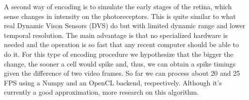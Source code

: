 A second way of encoding is to simulate the early stages of the retina, which
sense changes in intensity on the photoreceptors. This is quite similar to what 
real Dynamic Vison Sensors (DVS) do \cite{aer-retina-bernabe,dvs-zurich} but 
with limited dynamic range and lower temporal resolution. The main advantage is 
that no specialized hardware is needed and the operation is so fast that any 
recent computer should be able to do it. For this type of encoding procedure we 
hypothesize that the bigger the change, the sooner a cell would spike and, 
thus, we can obtain a spike timings given the difference of two video frames. 
So far we can process about 20 and 25 FPS using a Numpy and an OpenCL backend, 
respectively. Although it's currently a good approximation, more research on 
this algorithm. 


